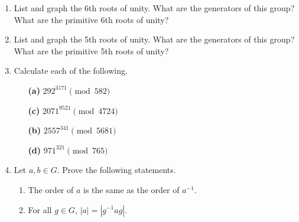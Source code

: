 {\begin{enumerate}
 
\bf\item\rm
List and graph the 6th roots of unity.  What are the generators of
this group?  What are the primitive 6th roots of unity?
 
 
\bf\item\rm
List and graph the 5th roots of unity.  What are the generators of
this group?  What are the primitive 5th roots of unity? 
 
 
\bf\item\rm
Calculate each of the following.
 
 
\vspace{3pt}        %
 
\hspace{-7pt}
\begin{minipage}[t]{4.6in}
\noindent
\begin{minipage}[t]{2.25in}
\begin{itemize}
 
 \item[{\bf (a)}]
$292^{3171} \pmod{ 582}$
 
 \item[{\bf (c)}]
$2071^{ 9521} \pmod{ 4724}$
 
\end{itemize}
\end{minipage} \hfill
\begin{minipage}[t]{2.25in}
\begin{itemize}
 
 \item[{\bf (b)}]
$2557^{ 341} \pmod{ 5681}$
 
 \item[{\bf (d)}]
$971^{ 321} \pmod{ 765}$
 
\end{itemize}
\end{minipage}
\end{minipage}
 
\vspace{2pt}        %
 
 
 
\bf\item\rm
Let $a, b \in G$.  Prove the following statements.
\begin{enumerate}
 
 \bf\item\rm
The order of $a$ is the same as the order of $a^{-1}$.
 
 \bf\item\rm
For all $g \in G$, $|a| = |g^{-1}ag|$.
 

\end{enumerate}
\end{enumerate}}

